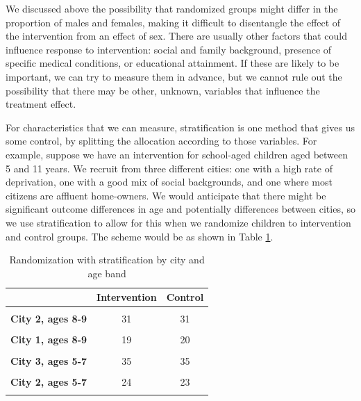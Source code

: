 \documentclass{krantz}
\begin{document}
We discussed above the possibility that randomized groups might differ in the proportion of males and females, making it difficult to disentangle the effect of the intervention from an effect of sex. There are usually other factors that could influence response to intervention: social and family background, presence of specific medical conditions, or educational attainment. If these are likely to be important, we can try to measure them in advance, but we cannot rule out the possibility that there may be other, unknown, variables that influence the treatment effect.

For characteristics that we can measure, stratification is one method that gives us some control, by splitting the allocation according to those variables. For example, suppose we have an intervention for school-aged children aged between 5 and 11 years. We recruit from three different cities: one with a high rate of deprivation, one with a good mix of social backgrounds, and one where most citizens are affluent home-owners. We would anticipate that there might be significant outcome differences in age and potentially differences between cities, so we use stratification to allow for this when we randomize children to intervention and control groups. The scheme would be as shown in Table \ref{tab:strattable}.

\begin{table}

\caption{\label{tab:strattable}Randomization with stratification by city and age band}
\centering
\begin{tabular}[t]{>{}lcc}
\toprule
  & Intervention & Control\\
\midrule
\textbf{\cellcolor{gray!6}{City 1, ages 5-7}} & \cellcolor{gray!6}{23} & \cellcolor{gray!6}{24}\\
\textbf{City 2, ages 8-9} & 31 & 31\\
\textbf{\cellcolor{gray!6}{City 3, ages 10-11}} & \cellcolor{gray!6}{28} & \cellcolor{gray!6}{27}\\
\textbf{City 1, ages 8-9} & 19 & 20\\
\textbf{\cellcolor{gray!6}{Cityl 2, ages 10-11}} & \cellcolor{gray!6}{25} & \cellcolor{gray!6}{24}\\
\addlinespace
\textbf{City 3, ages 5-7} & 35 & 35\\
\textbf{\cellcolor{gray!6}{City 1, ages 10-11}} & \cellcolor{gray!6}{22} & \cellcolor{gray!6}{27}\\
\textbf{City 2, ages 5-7} & 24 & 23\\
\textbf{\cellcolor{gray!6}{City 3, ages 8-9}} & \cellcolor{gray!6}{31} & \cellcolor{gray!6}{31}\\
\bottomrule
\end{tabular}
\end{table}
\end{document}
